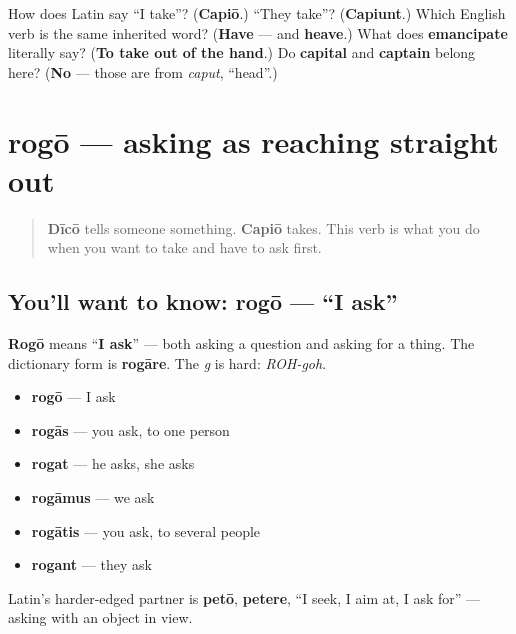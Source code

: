 \begin{tcolorbox}[breakable,colback=teal!4,colframe=teal!35!black,title={Before you move on}]
How does Latin say \textquotedblleft{}I take\textquotedblright{}? (\textbf{Capiō}.) \textquotedblleft{}They take\textquotedblright{}? (\textbf{Capiunt}.) Which English verb is the same inherited word? (\textbf{Have} — and \textbf{heave}.) What does \textbf{emancipate} literally say? (\textbf{To take out of the hand}.) Do \textbf{capital} and \textbf{captain} belong here? (\textbf{No} — those are from \emph{caput}, \textquotedblleft{}head\textquotedblright{}.)
\end{tcolorbox}
\section[rogō, rogāre]{rogō — asking as reaching straight out}

\label{lesson:LA-C38-rogo}



\begin{quote}
\textbf{Dīcō} tells someone something. \textbf{Capiō} takes. This verb is what you do when you want to take and have to ask first.
\end{quote}

\subsection*{You'll want to know: rogō — \textquotedblleft{}I ask\textquotedblright{}}
\textbf{Rogō} means \textquotedblleft{}\textbf{I ask}\textquotedblright{} — both asking a question and asking for a thing. The dictionary form is \textbf{rogāre}. The \emph{g} is hard: \emph{ROH-goh}.

\begin{itemize}
\raggedright
  \item \textbf{rogō} — I ask
  \item \textbf{rogās} — you ask, to one person
  \item \textbf{rogat} — he asks, she asks
  \item \textbf{rogāmus} — we ask
  \item \textbf{rogātis} — you ask, to several people
  \item \textbf{rogant} — they ask
\end{itemize}

Latin's harder-edged partner is \textbf{petō}, \textbf{petere}, \textquotedblleft{}I seek, I aim at, I ask for\textquotedblright{} — asking with an object in view.

